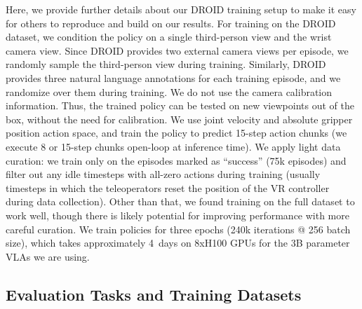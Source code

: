 Here, we provide further details about our DROID training setup to make it easy for others to reproduce and build on our results. For training on the DROID dataset, we condition the policy on a single third-person view and the wrist camera view. Since DROID provides two external camera views per episode, we randomly sample the third-person view during training. Similarly, DROID provides three natural language annotations for each training episode, and we randomize over them during training. We do not use the camera calibration information. Thus, the trained policy can be tested on new viewpoints out of the box, without the need for calibration. We use joint velocity and absolute gripper position action space, and train the policy to predict 15-step action chunks (we execute 8 or 15-step chunks open-loop at inference time). We apply light data curation: we train only on the episodes marked as ``success'' (75k episodes) and filter out any idle timesteps with all-zero actions during training (usually timesteps in which the teleoperators reset the position of the VR controller during data collection). Other than that, we found training on the full dataset to work well, though there is likely potential for improving performance with more careful curation. We train policies for three epochs (240k iterations @ 256 batch size), which takes approximately 4~days on 8xH100 GPUs for the 3B parameter VLAs we are using.

\subsection{Evaluation Tasks and Training Datasets}
\label{sec:app_exp_task_details}

